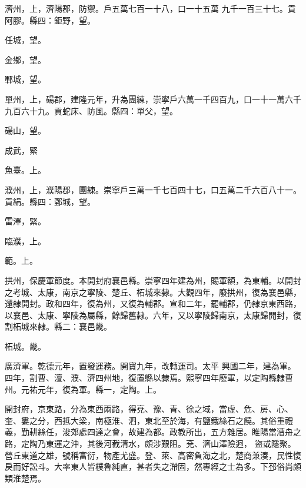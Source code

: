 \begin{pinyinscope}
 濟州，上，濟陽郡，防禦。戶五萬七百一十八，口一十五萬
 九千一百三十七。貢阿膠。縣四：鉅野，望。



 任城，望。



 金鄉，望。



 鄆城，望。



 單州，上，碭郡，建隆元年，升為團練，崇寧戶六萬一千四百九，口一十一萬六千九百六十九。貢蛇床、防風。縣四：單父，望。



 碭山，望。



 成武，緊



 魚臺。上。



 濮州，上，濮陽郡，團練。崇寧戶三萬一千七百四十七，口五萬二千六百八十一。貢絹。縣四：鄄城，望。



 雷澤，緊。



 臨濮，上。



 範。上。



 拱州，保慶軍節度。本開封府襄邑縣。崇寧四年建為州，賜軍額，為東輔。以開封之考城、太康，南京之寧陵、楚丘、柘城來隸。大觀四年，廢拱州，復為襄邑縣，還隸開封。政和四年，復為州，又復為輔郡。宣和二年，罷輔郡，仍隸京東西路，以襄邑、太康、寧陵為屬縣，餘歸舊隸。六年，又以寧陵歸南京，太康歸開封，復割柘城來隸。縣二：襄邑畿。



 柘城。畿。



 廣濟軍。乾德元年，置發運務。開寶九年，改轉運司。太平
 興國二年，建為軍。四年，割曹、澶、濮、濟四州地，復置縣以隸焉。熙寧四年廢軍，以定陶縣隸曹州。元祐元年，復為軍。縣一，定陶。上。



 開封府，京東路，分為東西兩路，得兗、豫、青、徐之域，當虛、危、房、心、奎、婁之分，西抵大梁，南極淮、泗，東北至於海，有鹽鐵絲石之饒。其俗重禮義，勤耕絲任，浚郊處四達之會，故建為都。政教所出，五方雜居。睢陽當漕舟之路，定陶乃東運之沖，其後河截清水，頗涉艱阻。兗、濟山澤險迥，
 盜或隱聚。營丘東道之雄，號稱富衍，物產尤盛。登、萊、高密負海之北，楚商兼湊，民性愎戾而好訟斗。大率東人皆樸魯純直，甚者失之滯固，然專經之士為多。下邳俗尚頗類淮楚焉。




\end{pinyinscope}
